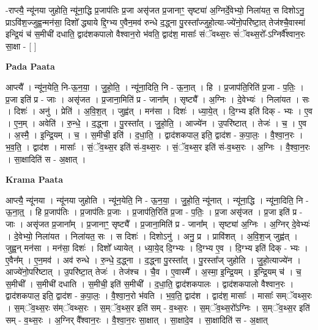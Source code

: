 \documentclass[17pt]{extarticle}
\begin{document}
-राप्त्यै॒ न्यू॑नया जुहोति॒ न्यू॑ना॒द्धि प्र॒जाप॑तिः प्र॒जा असृ॑जत प्र॒जानाꣳ॒॒ सृष्ट्या॑ अ॒ग्निर्दे॒वेभ्यो॒ निला॑यत॒ स दिशोऽनु॒ प्राऽवि॑श॒ज्जुह्व॒न्मन॑सा॒ दिशो᳚ द्ध्याये द्दि॒ग्भ्य ए॒वैन॒मव॑ रुन्धे द॒द्ध्ना पु॒रस्ता᳚ज्जुहो॒त्या-ज्ये॑नो॒परि॑ष्टा॒त् तेज॑श्चै॒वास्मा॑ इन्द्रि॒यं च॑ स॒मीची॑ दधाति॒ द्वाद॑शकपालो वैश्वान॒रो भ॑वति॒ द्वाद॑श॒ मासाः᳚ संॅवथ्स॒रः सं॑ॅवथ्स॒रो᳚-ऽग्निर्वै᳚श्वान॒रः सा॒क्षा - [  ] \newline

\textbf{Pada Paata} \newline

आप्त्यै᳚ । न्यू॑न॒येति॒ नि-ऊ॒न॒या॒ । जु॒हो॒ति॒ । न्यू॑ना॒दिति॒ नि - ऊ॒ना॒त् । हि । प्र॒जाप॑ति॒रिति॑ प्र॒जा - प॒तिः॒ । प्र॒जा इति॑ प्र - जाः । असृ॑जत । प्र॒जाना॒मिति॑ प्र - जाना᳚म् । सृष्ट्यै᳚ । अ॒ग्निः । दे॒वेभ्यः॑ । निला॑यत । सः । दिशः॑ । अनु॑ । प्रेति॑ । अ॒वि॒श॒त् । जुह्व॑त् । मन॑सा । दिशः॑ । ध्या॒ये॒त् । दि॒ग्भ्य इति॑ दिक् - भ्यः । ए॒व । ए॒न॒म् । अवेति॑ । रु॒न्धे॒ । द॒द्ध्ना । पु॒रस्ता᳚त् । जु॒हो॒ति॒ । आज्ये॑न । उ॒परि॑ष्टात् । तेजः॑ । च॒ । ए॒व । अ॒स्मै॒ । इ॒न्द्रि॒यम् । च॒ । स॒मीची॒ इति॑ । द॒धा॒ति॒ । द्वाद॑शकपाल॒ इति॒ द्वाद॑श - क॒पा॒लः॒ । वै॒श्वा॒न॒रः । भ॒व॒ति॒ । द्वाद॑श । मासाः᳚ । सं॒ॅव॒थ्स॒र इति॑ सं-व॒थ्स॒रः । सं॒ॅव॒थ्स॒र इति॑ सं-व॒थ्स॒रः । अ॒ग्निः । वै॒श्वा॒न॒रः । सा॒क्षादिति॑ स - अ॒क्षात् ।  \newline


\textbf{Krama Paata} \newline

आप्त्यै॒ न्यू॑नया । न्यू॑नया जुहोति । न्यू॑न॒येति॒ नि - ऊ॒न॒या॒ । जु॒हो॒ति॒ न्यू॑नात् । न्यू॑ना॒द्धि । न्यू॑ना॒दिति॒ नि - ऊ॒ना॒त्॒ । हि प्र॒जाप॑तिः । प्र॒जाप॑तिः प्र॒जाः । प्र॒जाप॑ति॒रिति॑ प्र॒जा - प॒तिः॒ । प्र॒जा असृ॑जत । प्र॒जा इति॑ प्र - जाः । असृ॑जत प्र॒जाना᳚म् । प्र॒जानाꣳ॒॒ सृष्ट्यै᳚ । प्र॒जाना॒मिति॑ प्र - जाना᳚म् । सृष्ट्या॑ अ॒ग्निः । अ॒ग्निर् दे॒वेभ्यः॑ । दे॒वेभ्यो॒ निला॑यत । निला॑यत॒ सः । स दिशः॑ । दिशोऽनु॑ । अनु॒ प्र । प्रावि॑शत् । अ॒वि॒श॒ज् जुह्व॑त् । जुह्व॒न् मन॑सा । मन॑सा॒ दिशः॑ । दिशो᳚ ध्यायेत् । ध्या॒ये॒द् दि॒ग्भ्यः । दि॒ग्भ्य ए॒व । दि॒ग्भ्य इति॑ दिक् - भ्यः । ए॒वैन᳚म् । ए॒न॒मव॑ । अव॑ रुन्धे । रु॒न्धे॒ द॒द्ध्ना । द॒द्ध्ना पु॒रस्ता᳚त् । पु॒रस्ता᳚ज् जुहोति । जु॒हो॒त्याज्ये॑न । आज्ये॑नो॒परि॑ष्टात् । उ॒परि॑ष्टा॒त् तेजः॑ । तेज॑श्च । चै॒व । ए॒वास्मै᳚ । अ॒स्मा॒ इ॒न्द्रि॒यम् । इ॒न्द्रि॒यम् च॑ । च॒ स॒मीची᳚ । स॒मीची॑ दधाति । स॒मीची॒ इति॑ स॒मीची᳚ । द॒धा॒ति॒ द्वाद॑शकपालः । द्वाद॑शकपालो वैश्वान॒रः । द्वाद॑शकपाल॒ इति॒ द्वाद॑श - क॒पा॒लः॒ । वै॒श्वा॒न॒रो भ॑वति । भ॒व॒ति॒ द्वाद॑श । द्वाद॑श॒ मासाः᳚ । मासाः᳚ सम्ॅवथ्स॒रः । स॒म्ॅव॒थ्स॒रः स॑म्ॅवथ्स॒रः । स॒म्ॅव॒थ्स॒र इति॑ सम् - व॒थ्स॒रः । स॒म्ॅव॒थ्स॒रो᳚ऽग्निः । स॒म्ॅव॒थ्स॒र इति॑ सम् - व॒थ्स॒रः । अ॒ग्निर् वै᳚श्वान॒रः । वै॒श्वा॒न॒रः सा॒क्षात् । सा॒क्षादे॒व । सा॒क्षादिति॑ स - अ॒क्षात् \newline
\end{document}
